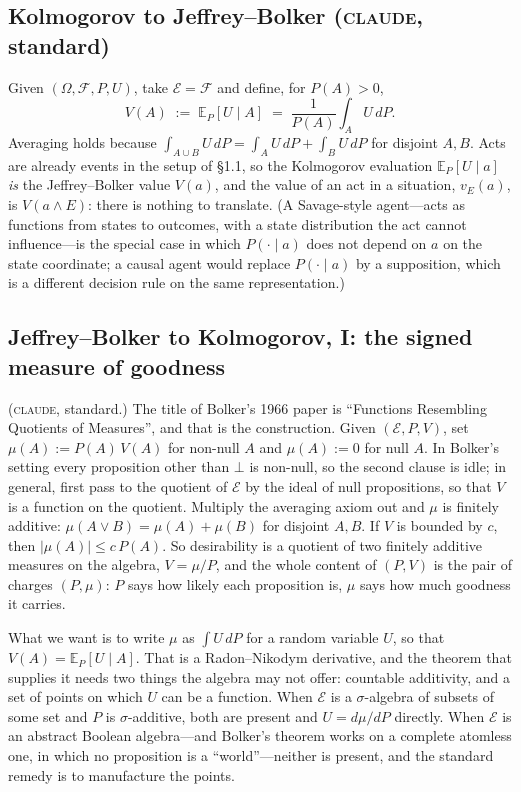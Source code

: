 \documentclass[11pt,a4paper]{article}
\newcommand{\E}{\mathbb{E}}
\newcommand{\cE}{\mathcal{E}}
\newcommand{\cF}{\mathcal{F}}
\newcommand{\CLAUDE}{\textnormal{\scshape claude}}
\begin{document}
\subsection{Kolmogorov to Jeffrey--Bolker (\CLAUDE, standard)}
Given $(\Omega, \cF, P, U)$, take $\cE = \cF$ and define, for $P(A) > 0$,
\[
V(A) \;:=\; \E_P[U \mid A] \;=\; \frac{1}{P(A)}\int_A U\,dP.
\]
Averaging holds because $\int_{A \cup B} U\,dP = \int_A U\,dP + \int_B U\,dP$ for disjoint $A, B$. Acts are already events in the setup of \S1.1, so the Kolmogorov evaluation $\mathbb E_P[ U \mid a]$ \emph{is} the Jeffrey--Bolker value $V(a)$, and the value of an act in a situation, $v_E(a)$, is $V(a \wedge E)$: there is nothing to translate. (A Savage-style agent---acts as functions from states to outcomes, with a state distribution the act cannot influence---is the special case in which $P(\cdot \mid a)$ does not depend on $a$ on the state coordinate; a causal agent would replace $P(\cdot \mid a)$ by a supposition, which is a different decision rule on the same representation.)

\subsection{Jeffrey--Bolker to Kolmogorov, I: the signed measure of goodness}
(\CLAUDE, standard.) The title of Bolker's 1966 paper is ``Functions Resembling Quotients of Measures'', and that is the construction. Given $(\cE, P, V)$, set $\mu(A) := P(A)\,V(A)$ for non-null $A$ and $\mu(A) := 0$ for null $A$. In Bolker's setting every proposition other than $\bot$ is non-null, so the second clause is idle; in general, first pass to the quotient of $\cE$ by the ideal of null propositions, so that $V$ is a function on the quotient. Multiply the averaging axiom out and $\mu$ is finitely additive: $\mu(A \vee B) = \mu(A) + \mu(B)$ for disjoint $A, B$. If $V$ is bounded by $c$, then $|\mu(A)| \le c\,P(A)$. So desirability is a quotient of two finitely additive measures on the algebra, $V = \mu/P$, and the whole content of $(P, V)$ is the pair of charges $(P, \mu)$: $P$ says how likely each proposition is, $\mu$ says how much goodness it carries.

What we want is to write $\mu$ as $\int U\,dP$ for a random variable $U$, so that $V(A) = \E_P[U \mid A]$. That is a Radon--Nikodym derivative, and the theorem that supplies it needs two things the algebra may not offer: countable additivity, and a set of points on which $U$ can be a function. When $\cE$ is a $\sigma$-algebra of subsets of some set and $P$ is $\sigma$-additive, both are present and $U = d\mu/dP$ directly. When $\cE$ is an abstract Boolean algebra---and Bolker's theorem works on a complete atomless one, in which no proposition is a ``world''---neither is present, and the standard remedy is to manufacture the points.
\end{document}
